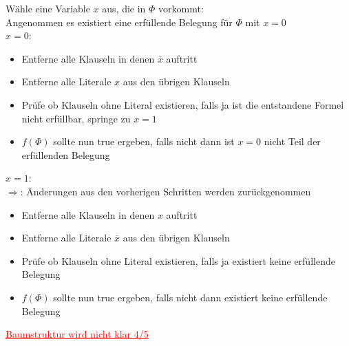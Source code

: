 \documentclass[a4paper,11pt,twoside]{article}
\newcommand{\korr}[2]{\sout{#1} \textcolor{red}{\underline{#2}}}
\begin{document}
Wähle eine Variable $x$ aus, die in $\Phi$ vorkommt:\\
Angenommen es existiert eine erfüllende Belegung für $\Phi$ mit $x=0$\\
$x=0$:\begin{itemize}
\item Entferne alle Klauseln in denen $\overline x$ auftritt
\item Entferne alle Literale $x$ aus den übrigen Klauseln
\item Prüfe ob Klauseln ohne Literal existieren, falls ja ist die entstandene Formel nicht erfüllbar, springe zu $x=1$
\item $f(\Phi)$ sollte nun true ergeben, falls nicht dann ist $x=0$ nicht Teil der erfüllenden Belegung
\end{itemize}
$x=1$:\\
$\Rightarrow$: Änderungen aus den vorherigen Schritten werden zurückgenommen
\begin{itemize}
\item Entferne alle Klauseln in denen $x$ auftritt
\item Entferne alle Literale $\overline x$ aus den übrigen Klauseln
\item Prüfe ob Klauseln ohne Literal existieren, falls ja existiert keine erfüllende Belegung
\item $f(\Phi)$ sollte nun true ergeben, falls nicht dann existiert keine erfüllende Belegung
\end{itemize} 
\korr{}{Baumstruktur wird nicht klar 4/5}
\end{document}
